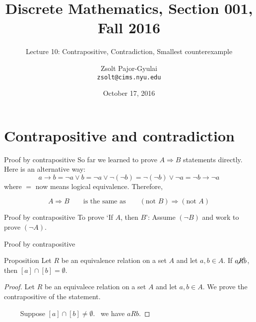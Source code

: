 \documentclass{beamer}
\title{Discrete Mathematics, Section 001, Fall 2016}
\subtitle{Lecture 10: Contrapositive, Contradiction, Smallest counterexample}
\date{October 17, 2016}
\author[Zsolt]{Zsolt Pajor-Gyulai \\ \texttt{zsolt@cims.nyu.edu}}
\institute[NYU] 
{
\normalsize Courant Institute of Mathematical Sciences
}
\def\bl[#1]#2{\begin{block}{#1}#2\end{block}}
\begin{document}
\begin{frame}
  \titlepage
\end{frame}


\section{Contrapositive and contradiction}

\begin{frame}{Proof by contrapositive}
So far we learned to prove $A\Rightarrow B$ statements directly. Here is an alternative way:
\[
a\rightarrow b=\neg a\vee b=\neg a\vee \neg(\neg b)=\neg(\neg b)\vee\neg a=\neg b\to \neg a
\]
where $=$ now means logical equivalence. Therefore,
\bl[]{
\[
A\Rightarrow B\qquad\textrm{is the same as}\qquad (\textrm{not }B)\Rightarrow (\textrm{not }A)
\]
}
\bl[Proof by contrapositive]{
To prove `If $A$, then $B$': Assume $(\neg B)$ and work to prove $(\neg A)$.
}
\end{frame}

\begin{frame}{Proof by contrapositive}
\bl[Proposition]{
Let $R$ be an equivalence relation on a set $A$ and let $a,b\in A$. If $a\cancel{R} b$, then $[a]\cap[b]=\emptyset$.
}

\begin{proof}
Let $R$ be an equivalece relation on a set $A$ and let $a,b\in A$. We prove the contrapositive of the statement.

~~~~ Suppose $[a]\cap[b]\neq\emptyset$. \color{black}~we have $a R b$.
\end{proof}

\end{frame}
\end{document}
